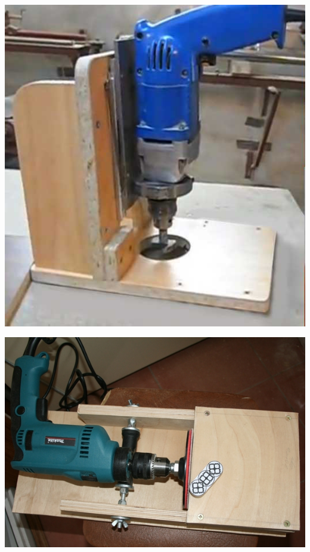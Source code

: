 \documentclass{magazine}
\begin{document}
\begin{multicols}{2}
\noindent\includegraphics[width=\columnwidth]{fig/00/DrelBoren.jpg}

\noindent\includegraphics[width=\columnwidth]{fig/00/DrelShliph.jpg}


\end{multicols}
\end{document}
